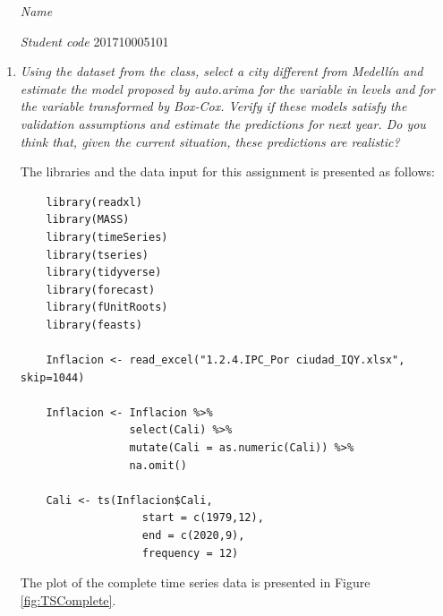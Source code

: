 \documentclass[fleqn]{article}
\begin{document}
 \vspace{0.3cm}
   \begin{itemize}[leftmargin=6.25cm, labelsep=0.5cm]

     \item[\textit{Name}]  %
     \item[\textit{Student code}] 201710005101 %

   \end{itemize}
\vspace{0.3cm}

\begin{enumerate}
    \item \textit{Using the dataset from the class, select a city different from Medellín and estimate the model proposed by auto.arima for the variable in levels and for the variable transformed by Box-Cox. Verify if these models satisfy the validation assumptions and estimate the predictions for next year. Do you think that, given the current situation, these predictions are realistic?}
    
    The libraries and the data input for this assignment is presented as follows:
    \begin{verbatim}
    library(readxl)
    library(MASS)
    library(timeSeries)
    library(tseries)
    library(tidyverse)
    library(forecast)
    library(fUnitRoots)
    library(feasts)
    
    Inflacion <- read_excel("1.2.4.IPC_Por ciudad_IQY.xlsx", skip=1044)

    Inflacion <- Inflacion %>%
                 select(Cali) %>%
                 mutate(Cali = as.numeric(Cali)) %>%
                 na.omit()
    
    Cali <- ts(Inflacion$Cali,
                   start = c(1979,12),
                   end = c(2020,9),
                   frequency = 12)
    \end{verbatim}
    
    The plot of the complete time series data is presented in Figure \ref{fig:TSComplete}.
    

\end{enumerate}
\end{document}
